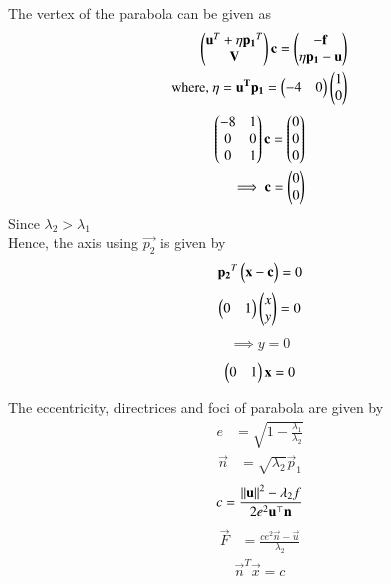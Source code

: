 The vertex of the parabola can be given as
\begin{align}
    \begin{pmatrix}\mathbf{u}^T+\eta\mathbf{p_1}^T\\\mathbf{V}\end{pmatrix}\mathbf{c}=\begin{pmatrix}\mathbf{-f}\\\eta\mathbf{p_1}-\mathbf{u}\end{pmatrix}\\
   \text{where, } \eta=\mathbf{u^T}\mathbf{p_1}=\begin{pmatrix}-4&0\end{pmatrix}\begin{pmatrix}1\\0\end{pmatrix}
    \end{align}
\begin{align}
    \begin{pmatrix}-8&1\\0&0\\0&1\end{pmatrix}\mathbf{c}=\begin{pmatrix}0\\0\\0\end{pmatrix}\\
    \implies \mathbf{c}=\begin{pmatrix}0\\0\end{pmatrix}
\end{align}
Since $\lambda_2 > \lambda_1$\\
Hence, the axis using $\vec{p_2}$ is given by
\begin{align}
    \mathbf{p_2}^T\begin{pmatrix}\mathbf{x}-\mathbf{c}\end{pmatrix}=0
    \end{align}
    \begin{align}
     \begin{pmatrix}0&1\end{pmatrix}\begin{pmatrix}x\\y\end{pmatrix}=0   
    \end{align}
    \begin{align}
       \implies y=0 
    \end{align}
    \begin{align}
    \begin{pmatrix}0&1\end{pmatrix}\mathbf{x}=0
\end{align}
\begin{theorem}
The eccentricity, directrices and foci of parabola are given by\\ 
\begin{align}
    e&= \sqrt{1-\frac{\lambda_1}{\lambda_2}} \label{oct/2/24/eq:1}
\end{align}
\begin{align}
  \vec{n}&= \sqrt{\lambda_2}\vec{p}_1 \label{oct/2/24/eq:2}
  \end{align}
  \begin{align}
  c = \frac{\left\lVert\mathbf{u}\right\rVert^2 - \lambda_2 f   }{2e^2\mathbf{u}^{\top}\mathbf{n}} \label{oct/2/24/eq:3}
  \end{align}
 \begin{align}
  \vec{F}  &= \frac{ce^2\vec{n}-\vec{u}}{\lambda_2}\label{oct/2/24/eq:4}
\end{align}
\begin{align}
\vec{n}^T \vec{x}=c \label{oct/2/24/eq:5}
 \end{align}
\end{theorem}

